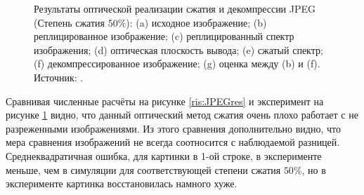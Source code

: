 \begin{figure}[h]
	\caption{Результаты оптической реализации сжатия и декомпрессии JPEG (Степень сжатия $50\%$): (a) исходное изображение; (b) реплицированное изображение; (c) реплицированный спектр изображения; (d) оптическая плоскость вывода; (e) сжатый спектр; (f) декомпрессированное изображение; (g) оценка между (b) и (f). Источник: \cite{alkholidi2007new}.}
	\label{ris:JPEGres2}
\end{figure}
Сравнивая численные расчёты на рисунке \ref{ris:JPEGres} и эксперимент на рисунке \ref{ris:JPEGres2} видно, что данный оптический метод сжатия очень плохо работает с не разреженными изображениями. Из этого сравнения дополнительно видно, что мера сравнения изображений не всегда соотносится с наблюдаемой разницей. Среднеквадратичная ошибка, для картинки в 1-ой строке, в эксперименте меньше, чем в симуляции для соответствующей степени сжатия $50\%$, но в эксперименте картинка восстановилась намного хуже.

